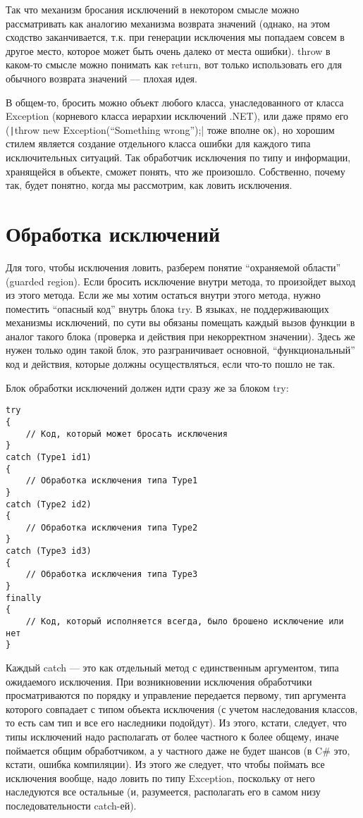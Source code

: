 \documentclass[a5paper]{article}
\begin{document}
Так что механизм бросания исключений в некотором смысле можно рассматривать как аналогию механизма возврата значений (однако, на этом сходство заканчивается, т.к. при генерации исключения мы попадаем совсем в другое место, которое может быть очень далеко от места ошибки). throw в каком-то смысле можно понимать как return, вот только использовать его для обычного возврата значений --- плохая идея.

В общем-то, бросить можно объект любого класса, унаследованного от класса Exception (корневого класса иерархии исключений .NET), или даже прямо его (\texttt|throw new Exception(``Something wrong'');| тоже вполне ок), но хорошим стилем является создание отдельного класса ошибки для каждого типа исключительных ситуаций. Так обработчик исключения по типу и информации, хранящейся в объекте, сможет понять, что же произошло. Собственно, почему так, будет понятно, когда мы рассмотрим, как ловить исключения. 

\section{Обработка исключений}

Для того, чтобы исключения ловить, разберем понятие ``охраняемой области'' (guarded region). Если бросить исключение внутри метода, то произойдет выход из этого метода. Если же мы хотим остаться внутри этого метода, нужно поместить ``опасный код'' внутрь блока try. В языках, не поддерживающих механизмы исключений, по сути вы обязаны помещать каждый вызов функции в аналог такого блока (проверка и действия при некорректном значении). Здесь же нужен только один такой блок, это разграничивает основной, ``функциональный'' код и действия, которые должны осуществляться, если что-то пошло не так.

Блок обработки исключений должен идти сразу же за блоком try:

\begin{verbatim}
try
{
    // Код, который может бросать исключения
}
catch (Type1 id1)
{
    // Обработка исключения типа Type1
}
catch (Type2 id2)
{
    // Обработка исключения типа Type2
}
catch (Type3 id3)
{
    // Обработка исключения типа Type3
}
finally
{
    // Код, который исполняется всегда, было брошено исключение или нет
}
\end{verbatim}

Каждый catch --- это как отдельный метод с единственным аргументом, типа ожидаемого исключения. При возникновении исключения обработчики просматриваются по порядку и управление передается первому, тип аргумента которого совпадает с типом объекта исключения (с учетом наследования классов, то есть сам тип и все его наследники подойдут). Из этого, кстати, следует, что типы исключений надо располагать от более частного к более общему, иначе поймается общим обработчиком, а у частного даже не будет шансов (в C\# это, кстати, ошибка компиляции). Из этого же следует, что чтобы поймать все исключения вообще, надо ловить по типу Exception, поскольку от него наследуются все остальные (и, разумеется, располагать его в самом низу последовательности catch-ей).
\end{document}
